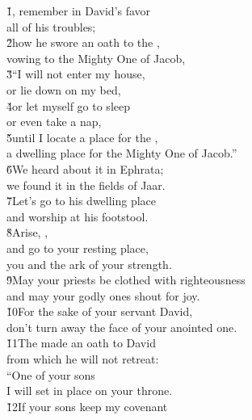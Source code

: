 \begin{poetry}
\poeml \v{1}, remember in David's favor \\
\poemll    all of his troubles; \\
\poeml \v{2}how he swore an oath to the , \\
\poemll    vowing to the Mighty One of Jacob, \\
\poeml \v{3}``I will not enter my house, \\
\poemll    or lie down on my bed, \\
\poeml \v{4}or let myself go to sleep \\
\poemll    or even take a nap, \\
\poeml \v{5}until I locate a place for the , \\
\poemll    a dwelling place for the Mighty One of Jacob.'' \\
\poeml \v{6}We heard about it in Ephrata; \\
\poemll    we found it in the fields of Jaar. \\
\poeml \v{7}Let's go to his dwelling place \\
\poemll    and worship at his footstool. \\
\poeml \v{8}Arise, , \\
\poemll    and go to your resting place, \\
\poemlll       you and the ark of your strength. \\
\poeml \v{9}May your priests be clothed with righteousness \\
\poemll    and may your godly ones shout for joy. \\
\poeml \v{10}For the sake of your servant David, \\
\poemll    don't turn away the face of your anointed one. \\
\poeml \v{11}The  made an oath to David \\
\poemll    from which he will not retreat: \\
\poeml ``One of your sons \\
\poemll    I will set in place on your throne. \\
\poeml \v{12}If your sons keep my covenant \\

\end{poetry}
